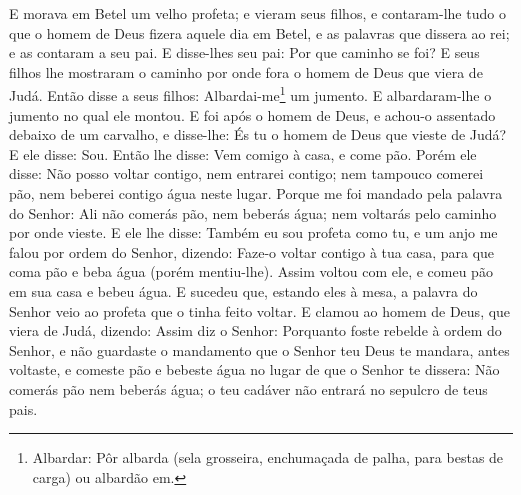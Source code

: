 E morava em Betel um velho profeta; e vieram seus filhos, e
contaram-lhe tudo o que o homem de Deus fizera aquele dia em Betel,
e as palavras que dissera ao rei; e as contaram a seu pai. E
disse-lhes seu pai: Por que caminho se foi? E seus filhos lhe
mostraram o caminho por onde fora o homem de Deus que viera de Judá.
Então disse a seus filhos: Albardai-me\footnote{Albardar: Pôr
albarda (sela grosseira, enchumaçada de palha, para bestas de carga)
ou albardão em.} um jumento. E albardaram-lhe o jumento no qual ele
montou. E foi após o homem de Deus, e achou-o assentado
debaixo de um carvalho, e disse-lhe: És tu o homem de Deus que
vieste de Judá? E ele disse: Sou. Então lhe disse: Vem comigo
à casa, e come pão. Porém ele disse: Não posso voltar
contigo, nem entrarei contigo; nem tampouco comerei pão, nem beberei
contigo água neste lugar. Porque me foi mandado pela palavra
do Senhor: Ali não comerás pão, nem beberás água; nem voltarás pelo
caminho por onde vieste. E ele lhe disse: Também eu sou
profeta como tu, e um anjo me falou por ordem do Senhor, dizendo:
Faze-o voltar contigo à tua casa, para que coma pão e beba água
(porém mentiu-lhe). Assim voltou com ele, e comeu pão em sua
casa e bebeu água. E sucedeu que, estando eles à mesa, a
palavra do Senhor veio ao profeta que o tinha feito voltar. E
clamou ao homem de Deus, que viera de Judá, dizendo: Assim diz o
Senhor: Porquanto foste rebelde à ordem do Senhor, e não guardaste o
mandamento que o Senhor teu Deus te mandara, antes voltaste,
e comeste pão e bebeste água no lugar de que o Senhor te dissera:
Não comerás pão nem beberás água; o teu cadáver não entrará no
sepulcro de teus pais.

